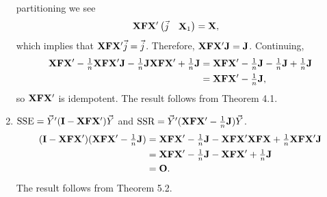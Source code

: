 \begin{Theorem}{}{}
\begin{enumerate}[(1)]
              partitioning we see
              \begin{align*}
                  \mathbf{X}\mathbf{F}\mathbf{X}'\begin{pmatrix}
                                                     \vec{j} & \mathbf{X}_1
                                                 \end{pmatrix} & =\mathbf{X},
              \end{align*}
              which implies that $ \mathbf{X}\mathbf{F}\mathbf{X}'\vec{j}=\vec{j} $.
              Therefore, $ \mathbf{X}\mathbf{F}\mathbf{X}'\mathbf{J}=\mathbf{J} $. Continuing,
              \begin{align*}
                  \mathbf{X}\mathbf{F}\mathbf{X}'-\tfrac{1}{n}\mathbf{X}\mathbf{F}\mathbf{X}'\mathbf{J}-\tfrac{1}{n}\mathbf{J}\mathbf{X}\mathbf{F}\mathbf{X}'+\tfrac{1}{n}\mathbf{J}
                   & =\mathbf{X}\mathbf{F}\mathbf{X}'-\tfrac{1}{n}\mathbf{J}-\tfrac{1}{n}\mathbf{J}+\tfrac{1}{n}\mathbf{J} \\
                   & =\mathbf{X}\mathbf{F}\mathbf{X}'-\tfrac{1}{n}\mathbf{J},
              \end{align*}
              so $ \mathbf{X}\mathbf{F}\mathbf{X}' $ is idempotent. The result follows from Theorem 4.1.
        \item $ \text{SSE}=\vec{Y}'(\mathbf{I}-\mathbf{X}\mathbf{F}\mathbf{X}')\vec{Y} $
              and $ \text{SSR}=\vec{Y}'(\mathbf{X}\mathbf{F}\mathbf{X}'-\tfrac{1}{n}\mathbf{J})\vec{Y} $.
              \begin{align*}
                  (\mathbf{I}-\mathbf{X}\mathbf{F}\mathbf{X}')(\mathbf{X}\mathbf{F}\mathbf{X}'-\tfrac{1}{n}\mathbf{J})
                   & =\mathbf{X}\mathbf{F}\mathbf{X}'-\tfrac{1}{n}\mathbf{J}-\mathbf{X}\mathbf{F}\mathbf{X}'\mathbf{X}\mathbf{F}\mathbf{X}+\tfrac{1}{n}\mathbf{X}\mathbf{F}\mathbf{X}'\mathbf{J} \\
                   & =\mathbf{X}\mathbf{F}\mathbf{X}'-\tfrac{1}{n}\mathbf{J}-\mathbf{X}\mathbf{F}\mathbf{X}'+\tfrac{1}{n}\mathbf{J}                                                              \\
                   & =\mathbf{O}.
              \end{align*}
              The result follows from Theorem 5.2.
    \end{enumerate}
\end{Theorem}
